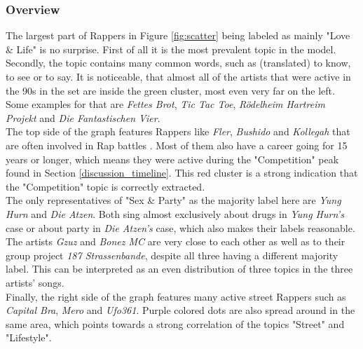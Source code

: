 \documentclass[conference]{IEEEtran}
\begin{document}
\subsubsection{Overview}
The largest part of Rappers in Figure \ref{fig:scatter} being labeled as mainly "Love \& Life" is no surprise. First of all it is the most prevalent topic in the model. Secondly, the topic contains many common words, such as (translated) to know, to see or to say. It is noticeable, that almost all of the artists that were active in the 90s in the set are inside the green cluster, most even very far on the left. Some examples for that are \textit{Fettes Brot}, \textit{Tic Tac Toe}, \textit{R\"odelheim Hartreim Projekt} and \textit{Die Fantastischen Vier}.\\
The top side of the graph features Rappers like \textit{Fler}, \textit{Bushido} and \textit{Kollegah} that are often involved in Rap battles \cite{battles}. Most of them also have a career going for 15 years or longer, which means they were active during the "Competition" peak found in Section \ref{discussion_timeline}. This red cluster is a strong indication that the "Competition" topic is correctly extracted.\\
The only representatives of "Sex \& Party" as the majority label here are \textit{Yung Hurn} and \textit{Die Atzen}. Both sing almost exclusively about drugs in \textit{Yung Hurn's} case or about party in \textit{Die Atzen's} case, which also makes their labels reasonable.\\
The artists \textit{Gzuz} and \textit{Bonez MC} are very close to each other as well as to their group project \textit{187 Strassenbande}, despite all three having a different majority label. This can be interpreted as an even distribution of three topics in the three artists' songs.\\
Finally, the right side of the graph features many active street Rappers \cite{strassenrap} such as \textit{Capital Bra}, \textit{Mero} and \textit{Ufo361}. Purple colored dots are also spread around in the same area, which points towards a strong correlation of the topics "Street" and "Lifestyle".
\end{document}
